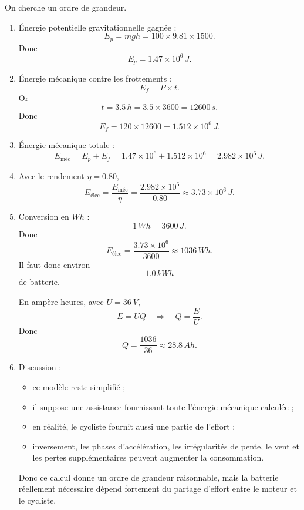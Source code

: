 \documentclass[11pt,a4paper]{article}
\begin{document}
\begin{corrigebox}
On cherche un ordre de grandeur.

\begin{enumerate}[label=\alph*)]
    \item Énergie potentielle gravitationnelle gagnée :
    \[
    E_p = mgh = 100\times 9.81\times 1500.
    \]
    Donc
    \[
    E_p = 1.47\times 10^6\,\si{J}.
    \]

    \item Énergie mécanique contre les frottements :
    \[
    E_f = P\times t.
    \]
    Or
    \[
    t=3.5\,\si{h}=3.5\times 3600 = 12600\,\si{s}.
    \]
    Donc
    \[
    E_f = 120\times 12600 = 1.512\times 10^6\,\si{J}.
    \]

    \item Énergie mécanique totale :
    \[
    E_{\text{méc}}=E_p+E_f
    =1.47\times 10^6 +1.512\times 10^6
    =2.982\times 10^6\,\si{J}.
    \]

    \item Avec le rendement \(\eta=0.80\),
    \[
    E_{\text{élec}}=\frac{E_{\text{méc}}}{\eta}
    =\frac{2.982\times 10^6}{0.80}
    \approx 3.73\times 10^6\,\si{J}.
    \]

    \item Conversion en \(\si{Wh}\) :
    \[
    1\,\si{Wh}=3600\,\si{J}.
    \]
    Donc
    \[
    E_{\text{élec}}=\frac{3.73\times 10^6}{3600}\approx 1036\,\si{Wh}.
    \]
    Il faut donc environ
    \[
    \boxed{1.0\,\si{kWh}}
    \]
    de batterie.

    En ampère-heures, avec \(U=\SI{36}{V}\),
    \[
    E=UQ \quad \Rightarrow \quad Q=\frac{E}{U}.
    \]
    Donc
    \[
    Q=\frac{1036}{36}\approx 28.8\,\si{Ah}.
    \]

    \item Discussion :
    \begin{itemize}
        \item ce modèle reste simplifié ;
        \item il suppose une assistance fournissant toute l'énergie mécanique calculée ;
        \item en réalité, le cycliste fournit aussi une partie de l'effort ;
        \item inversement, les phases d'accélération, les irrégularités de pente, le vent et les pertes supplémentaires peuvent augmenter la consommation.
    \end{itemize}
    Donc ce calcul donne un ordre de grandeur raisonnable, mais la batterie réellement nécessaire dépend fortement du partage d'effort entre le moteur et le cycliste.
\end{enumerate}
\end{corrigebox}
\end{document}
